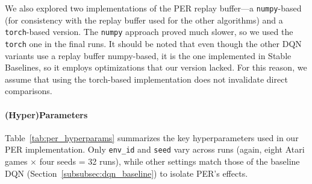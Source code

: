 We also explored two implementations of the PER replay buffer—a \texttt{numpy}-based (for consistency with the replay buffer used for the other algorithms) and a \texttt{torch}-based version. The \texttt{numpy} approach proved much slower, so we used the \texttt{torch} one in the final runs. It should be noted that even though the other DQN variants use a replay buffer numpy-based, it is the one implemented in Stable Baselines, so it employs optimizations that our version lacked. For this reason, we assume that using the torch-based implementation does not invalidate direct comparisons.

\paragraph{(Hyper)Parameters}
Table~\ref{tab:per_hyperparams} summarizes the key hyperparameters 
used in our PER implementation. 
Only \texttt{env\_id} and \texttt{seed} vary across runs 
(again, eight Atari games $\times$ four seeds = 32 runs), 
while other settings match those of the baseline DQN 
(Section~\ref{subsubsec:dqn_baseline}) to isolate PER’s effects.

